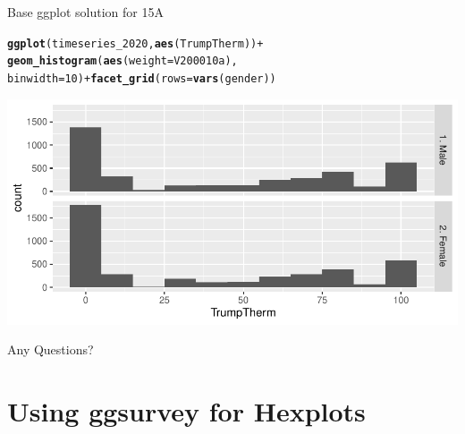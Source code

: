 \documentclass{beamer}\usepackage[]{graphicx}\usepackage[]{xcolor}
\makeatletter
\newcommand{\hlnum}[1]{\textcolor[rgb]{0.686,0.059,0.569}{#1}}%
\newcommand{\hlopt}[1]{\textcolor[rgb]{0,0,0}{#1}}%
\newcommand{\hlstd}[1]{\textcolor[rgb]{0.345,0.345,0.345}{#1}}%
\newcommand{\hlkwc}[1]{\textcolor[rgb]{0.333,0.667,0.333}{#1}}%
\newcommand{\hlkwd}[1]{\textcolor[rgb]{0.737,0.353,0.396}{\textbf{#1}}}%
\newenvironment{kframe}{%
 \def\at@end@of@kframe{}%
 \ifinner\ifhmode%
  \def\at@end@of@kframe{\end{minipage}}%
  \begin{minipage}{\columnwidth}%
 \fi\fi%
 \def\FrameCommand##1{\hskip\@totalleftmargin \hskip-\fboxsep
 \colorbox{shadecolor}{##1}\hskip-\fboxsep
     \hskip-\linewidth \hskip-\@totalleftmargin \hskip\columnwidth}%
 \MakeFramed {\advance\hsize-\width
   \@totalleftmargin\z@ \linewidth\hsize
   \@setminipage}}%
 {\par\unskip\endMakeFramed%
 \at@end@of@kframe}
\newenvironment{knitrout}{}{} %
\makeatother
\begin{document}
\begin{frame}[fragile]{Base ggplot solution for 15A}
\begin{knitrout}
\color{fgcolor}\begin{kframe}
\begin{alltt}
\hlkwd{ggplot}\hlstd{(timeseries_2020,} \hlkwd{aes}\hlstd{(TrumpTherm))} \hlopt{+}
    \hlkwd{geom_histogram}\hlstd{(}\hlkwd{aes}\hlstd{(}\hlkwc{weight} \hlstd{= V200010a),}
        \hlkwc{binwidth} \hlstd{=} \hlnum{10}\hlstd{)} \hlopt{+} \hlkwd{facet_grid}\hlstd{(}\hlkwc{rows} \hlstd{=} \hlkwd{vars}\hlstd{(gender))}
\end{alltt}
\end{kframe}
\includegraphics[width=0.95\linewidth]{figure/unnamed-chunk-79-1} 
\end{knitrout}

\end{frame}

\begin{frame}{Any Questions?}
\end{frame}
\section{Using ggsurvey for Hexplots}
\end{document}
